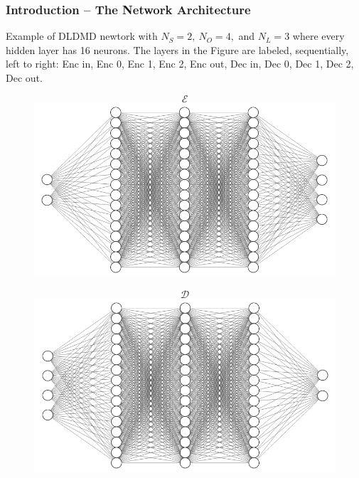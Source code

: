 \documentclass[11pt,aspectratio=169]{beamer}
\begin{document}
    \begin{frame}
        \frametitle{Introduction -- The Network Architecture}
        Example of DLDMD newtork with $N_S = 2,\ N_O = 4,$ and $N_L = 3$ where every
        hidden layer has 16 neurons. The layers in the Figure are 
        labeled, sequentially, left to right: Enc in, Enc 0, Enc 1, Enc 2, Enc out, Dec in, 
        Dec 0, Dec 1, Dec 2, Dec out.
        \begin{figure}
            \centering
            \begin{minipage}{.5\textwidth}
                $$\mathcal{E}$$
                \includegraphics[width=\textwidth]{../Figures/Encoder.png}
            \end{minipage}%
            \begin{minipage}{.5\textwidth}
                $$\mathcal{D}$$
                \includegraphics[width=\textwidth]{../Figures/Decoder.png}
            \end{minipage}
        \end{figure}
    \end{frame}
\end{document}
